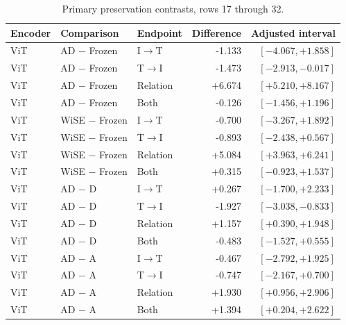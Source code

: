 \begin{table}[t]
\centering
\small
\setlength{\tabcolsep}{3pt}
\begin{tabular}{lllrr}
\toprule
Encoder & Comparison & Endpoint & Difference & Adjusted interval\\
\midrule
ViT & AD $-$ Frozen & I$\to$T & -1.133 & $[-4.067,+1.858]$ \\
ViT & AD $-$ Frozen & T$\to$I & -1.473 & $[-2.913,-0.017]$ \\
ViT & AD $-$ Frozen & Relation & +6.674 & $[+5.210,+8.167]$ \\
ViT & AD $-$ Frozen & Both & -0.126 & $[-1.456,+1.196]$ \\
ViT & WiSE $-$ Frozen & I$\to$T & -0.700 & $[-3.267,+1.892]$ \\
ViT & WiSE $-$ Frozen & T$\to$I & -0.893 & $[-2.438,+0.567]$ \\
ViT & WiSE $-$ Frozen & Relation & +5.084 & $[+3.963,+6.241]$ \\
ViT & WiSE $-$ Frozen & Both & +0.315 & $[-0.923,+1.537]$ \\
ViT & AD $-$ D & I$\to$T & +0.267 & $[-1.700,+2.233]$ \\
ViT & AD $-$ D & T$\to$I & -1.927 & $[-3.038,-0.833]$ \\
ViT & AD $-$ D & Relation & +1.157 & $[+0.390,+1.948]$ \\
ViT & AD $-$ D & Both & -0.483 & $[-1.527,+0.555]$ \\
ViT & AD $-$ A & I$\to$T & -0.467 & $[-2.792,+1.925]$ \\
ViT & AD $-$ A & T$\to$I & -0.747 & $[-2.167,+0.700]$ \\
ViT & AD $-$ A & Relation & +1.930 & $[+0.956,+2.906]$ \\
ViT & AD $-$ A & Both & +1.394 & $[+0.204,+2.622]$ \\
\bottomrule
\end{tabular}
\caption{Primary preservation contrasts, rows 17 through 32.}\label{tab:adprimary16}
\end{table}


